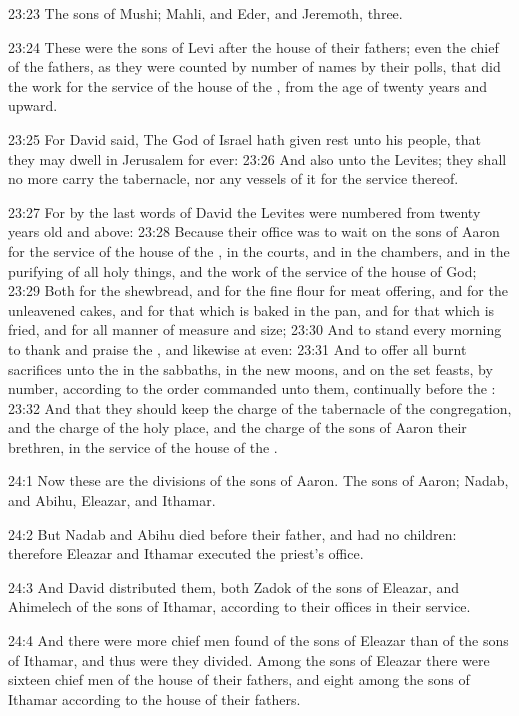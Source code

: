 23:23 The sons of Mushi; Mahli, and Eder, and Jeremoth, three.

23:24 These were the sons of Levi after the house of their fathers;
even the chief of the fathers, as they were counted by number of names
by their polls, that did the work for the service of the house of the
\LORD, from the age of twenty years and upward.

23:25 For David said, The \LORD God of Israel hath given rest unto his
people, that they may dwell in Jerusalem for ever: 23:26 And also unto
the Levites; they shall no more carry the tabernacle, nor any vessels
of it for the service thereof.

23:27 For by the last words of David the Levites were numbered from
twenty years old and above: 23:28 Because their office was to wait on
the sons of Aaron for the service of the house of the \LORD, in the
courts, and in the chambers, and in the purifying of all holy things,
and the work of the service of the house of God; 23:29 Both for the
shewbread, and for the fine flour for meat offering, and for the
unleavened cakes, and for that which is baked in the pan, and for that
which is fried, and for all manner of measure and size; 23:30 And to
stand every morning to thank and praise the \LORD, and likewise at
even: 23:31 And to offer all burnt sacrifices unto the \LORD in the
sabbaths, in the new moons, and on the set feasts, by number,
according to the order commanded unto them, continually before the
\LORD: 23:32 And that they should keep the charge of the tabernacle of
the congregation, and the charge of the holy place, and the charge of
the sons of Aaron their brethren, in the service of the house of the
\LORD.

24:1 Now these are the divisions of the sons of Aaron. The sons of
Aaron; Nadab, and Abihu, Eleazar, and Ithamar.

24:2 But Nadab and Abihu died before their father, and had no
children: therefore Eleazar and Ithamar executed the priest's office.

24:3 And David distributed them, both Zadok of the sons of Eleazar,
and Ahimelech of the sons of Ithamar, according to their offices in
their service.

24:4 And there were more chief men found of the sons of Eleazar than
of the sons of Ithamar, and thus were they divided. Among the sons of
Eleazar there were sixteen chief men of the house of their fathers,
and eight among the sons of Ithamar according to the house of their
fathers.

